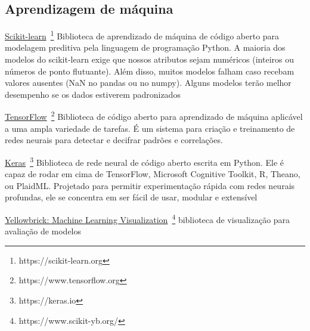 \subsection{Aprendizagem de máquina}

\underline{Scikit-learn}~\footnote{https://scikit-learn.org}
Biblioteca de aprendizado de máquina de código aberto para modelagem preditiva pela linguagem de programação Python.
A maioria dos modelos do scikit-learn exige que nossos atributos sejam numéricos (inteiros ou números de ponto
flutuante). 
Além disso, muitos modelos falham caso recebam valores ausentes (NaN no pandas ou no numpy). 
Alguns modelos terão melhor desempenho se os dados estiverem padronizados 


\underline{TensorFlow}~\footnote{https://www.tensorflow.org}
Biblioteca de código aberto para aprendizado de máquina aplicável a uma ampla variedade de tarefas. 
É um sistema para criação e treinamento de redes neurais para detectar e decifrar padrões e correlações.

\underline{Keras}~\footnote{https://keras.io}
Biblioteca de rede neural de código aberto escrita em Python. 
Ele é capaz de rodar em cima de TensorFlow, Microsoft Cognitive Toolkit, R, Theano, ou PlaidML. 
Projetado para permitir experimentação rápida com redes neurais profundas, ele se concentra em ser fácil de usar, modular e extensível

\underline{Yellowbrick: Machine Learning Visualization}~\footnote{https://www.scikit-yb.org/}
biblioteca de visualização para avaliação de modelos
